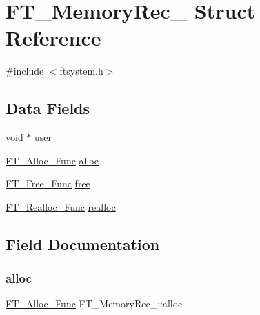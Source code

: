 \hypertarget{struct_f_t___memory_rec__}{}\section{F\+T\+\_\+\+Memory\+Rec\+\_\+ Struct Reference}
\label{struct_f_t___memory_rec__}


{\ttfamily \#include $<$ftsystem.\+h$>$}

\subsection*{Data Fields}
\begin{DoxyCompactItemize}
\item 
\hyperlink{png_8h_ac9c84fa68bbad002983e35ce3663c686}{void} $\ast$ \hyperlink{struct_f_t___memory_rec___aae5bc614434ba4525e37d7faaf03c4b7}{user}
\item 
\hyperlink{ftsystem_8h_ae36240d207415b573f5b84416b426540}{F\+T\+\_\+\+Alloc\+\_\+\+Func} \hyperlink{struct_f_t___memory_rec___a2269eada6afbb008fe5c73707145410c}{alloc}
\item 
\hyperlink{ftsystem_8h_abbf66b34e6c3a7f9564cbe3d6fa6c6fb}{F\+T\+\_\+\+Free\+\_\+\+Func} \hyperlink{struct_f_t___memory_rec___a83ab2422bd9265d8731b9e5e368ba240}{free}
\item 
\hyperlink{ftsystem_8h_a264ca9013613b2454d64987bf768ac93}{F\+T\+\_\+\+Realloc\+\_\+\+Func} \hyperlink{struct_f_t___memory_rec___a5ce3424cc72e898fe973ffeabe44a95c}{realloc}
\end{DoxyCompactItemize}


\subsection{Field Documentation}
\mbox{\label{struct_f_t___memory_rec___a2269eada6afbb008fe5c73707145410c}} 
\subsubsection{\texorpdfstring{alloc}{alloc}}
{\footnotesize\ttfamily \hyperlink{ftsystem_8h_ae36240d207415b573f5b84416b426540}{F\+T\+\_\+\+Alloc\+\_\+\+Func} F\+T\+\_\+\+Memory\+Rec\+\_\+\+::alloc}

\mbox{\label{struct_f_t___memory_rec___a83ab2422bd9265d8731b9e5e368ba240}} 
